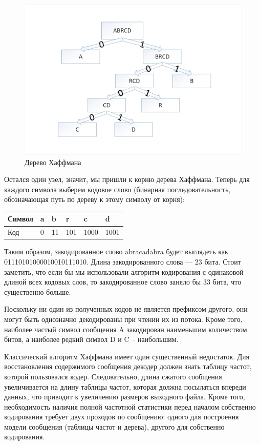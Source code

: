 \begin{figure}[h!]
            \centering
            \includegraphics[scale=0.5]{assets/huffman.jpg}
            \caption{Дерево Хаффмана}
            \label{img:1}
        \end{figure}

Остался один узел, значит, мы пришли к корню дерева Хаффмана. Теперь для каждого символа выберем кодовое слово (бинарная последовательность, обозначающая путь по дереву к этому символу от корня):

\begin{table}[H]
\begin{tabular}{|l|l|l|l|l|l|}
\hline
Символ & a & b  & r   & c    & d    \\ \hline
Код    & 0 & 11 & 101 & 1000 & 1001 \\ \hline
\end{tabular}
\end{table}

Таким образом, закодированное слово abracadabra будет выглядеть как 01110101000010010111010. Длина закодированного слова — 23 бита. Стоит заметить, что если бы мы использовали алгоритм кодирования с одинаковой длиной всех кодовых слов, то закодированное слово заняло бы 33 бита, что существенно больше.

Поскольку ни один из полученных кодов не является префиксом другого, они могут быть однозначно декодированы при чтении их из потока. Кроме того, наиболее частый символ сообщения A закодирован наименьшим количеством битов, а наиболее редкий символ D и C – наибольшим.

Классический алгоритм Хаффмана имеет один существенный недостаток. Для восстановления содержимого сообщения декодер должен знать таблицу частот, которой пользовался кодер. Следовательно, длина сжатого сообщения увеличивается на длину таблицы частот, которая должна посылаться впереди данных, что приводит к увеличению размеров выходного файла. Кроме того, необходимость наличия полной частотной статистики перед началом собственно кодирования требует двух проходов по сообщению: одного для построения модели сообщения (таблицы частот и дерева), другого для собственно кодирования.